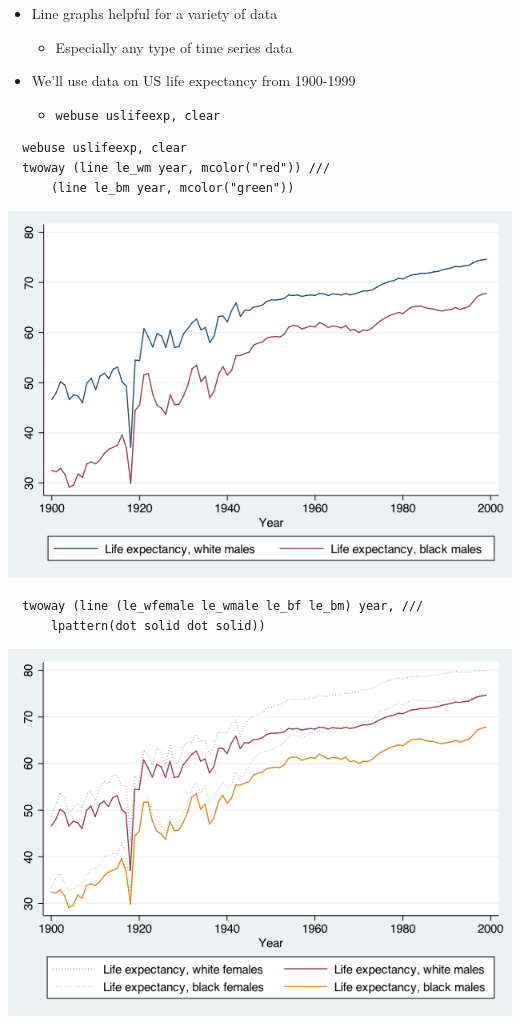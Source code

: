 \documentclass[]{book}
\providecommand{\tightlist}{%
  \setlength{\itemsep}{0pt}\setlength{\parskip}{0pt}}
\begin{document}
\begin{itemize}
\tightlist
\item
  Line graphs helpful for a variety of data

  \begin{itemize}
  \tightlist
  \item
    Especially any type of time series data
  \end{itemize}
\item
  We'll use data on US life expectancy from 1900-1999

  \begin{itemize}
  \tightlist
  \item
    \texttt{webuse\ uslifeexp,\ clear}
  \end{itemize}
\end{itemize}

\begin{verbatim}
  webuse uslifeexp, clear
  twoway (line le_wm year, mcolor("red")) ///
      (line le_bm year, mcolor("green"))
\end{verbatim}

\includegraphics{Stata/StataModGraph/images/lineGraph1.png}

\begin{verbatim}
  twoway (line (le_wfemale le_wmale le_bf le_bm) year, ///
      lpattern(dot solid dot solid))
\end{verbatim}

\includegraphics{Stata/StataModGraph/images/linegraph2.png}
\end{document}
